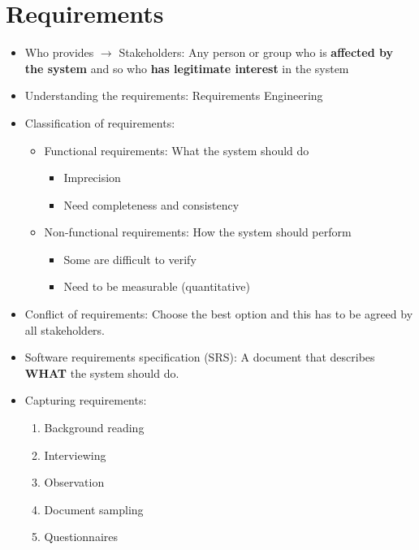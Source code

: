 \documentclass[12pt,openany]{book}
\begin{document}
\section{Requirements}
\begin{itemize}
    \item Who provides $\rightarrow$ Stakeholders: Any person or group who is \textbf{affected by the system} and so who \textbf{has legitimate interest} in the system
    \item Understanding the requirements: Requirements Engineering
    \item Classification of requirements:
    \begin{itemize}
        \item Functional requirements: What the system should do
        \begin{itemize}
            \item Imprecision
            \item Need completeness and consistency
        \end{itemize}
        \item Non-functional requirements: How the system should perform
        \begin{itemize}
            \item Some are difficult to verify
            \item Need to be measurable (quantitative)
        \end{itemize}
    \end{itemize}
    \item Conflict of requirements: Choose the best option and this has to be agreed by all stakeholders.
    \item Software requirements specification (SRS): A document that describes \textbf{WHAT} the system should do.
    \item Capturing requirements:
    \begin{enumerate}
        \item Background reading
        \item Interviewing
        \item Observation
        \item Document sampling
        \item Questionnaires
    \end{enumerate}
\end{itemize}
\end{document}
